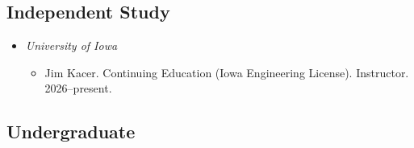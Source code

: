 \documentclass[10pt,oneside]{article}
\begin{document}
\subsection{\normalfont\bfseries Independent Study}

\begin{itemize}[label={}, leftmargin=1.5em, nosep, noitemsep]



  \item \textit{University of Iowa}

  \begin{itemize}[label={}, leftmargin=1.5em, nosep, noitemsep]

    

      
      \item Jim Kacer. Continuing Education (Iowa Engineering License). Instructor. 2026--present.  
      

    

  \end{itemize}



\end{itemize}



\subsection{\normalfont\bfseries Undergraduate}
\end{document}
